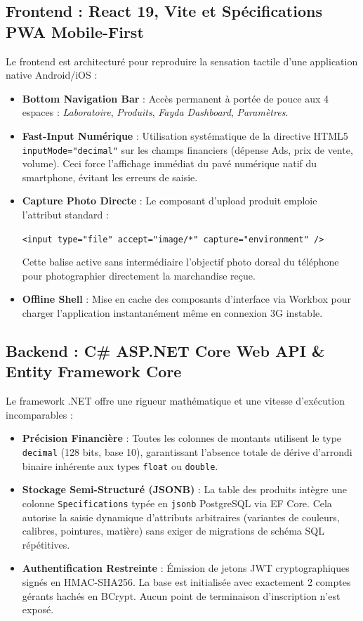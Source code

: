 \documentclass[11pt,a4paper]{article}
\begin{document}
\subsection{Frontend : React 19, Vite et Spécifications PWA Mobile-First}
Le frontend est architecturé pour reproduire la sensation tactile d'une application native Android/iOS :
\begin{itemize}[leftmargin=*]
    \item \textbf{Bottom Navigation Bar} : Accès permanent à portée de pouce aux 4 espaces : \textit{Laboratoire}, \textit{Produits}, \textit{Fayda Dashboard}, \textit{Paramètres}.
    \item \textbf{Fast-Input Numérique} : Utilisation systématique de la directive HTML5 \texttt{inputMode="decimal"} sur les champs financiers (dépense Ads, prix de vente, volume). Ceci force l'affichage immédiat du pavé numérique natif du smartphone, évitant les erreurs de saisie.
    \item \textbf{Capture Photo Directe} : Le composant d'upload produit emploie l'attribut standard :
    \begin{center}
        \texttt{<input type="file" accept="image/*" capture="environment" />}
    \end{center}
    Cette balise active sans intermédiaire l'objectif photo dorsal du téléphone pour photographier directement la marchandise reçue.
    \item \textbf{Offline Shell} : Mise en cache des composants d'interface via Workbox pour charger l'application instantanément même en connexion 3G instable.
\end{itemize}

\subsection{Backend : C\# ASP.NET Core Web API \& Entity Framework Core}
Le framework .NET offre une rigueur mathématique et une vitesse d'exécution incomparables :
\begin{itemize}[leftmargin=*]
    \item \textbf{Précision Financière} : Toutes les colonnes de montants utilisent le type \texttt{decimal} (128 bits, base 10), garantissant l'absence totale de dérive d'arrondi binaire inhérente aux types \texttt{float} ou \texttt{double}.
    \item \textbf{Stockage Semi-Structuré (JSONB)} : La table des produits intègre une colonne \texttt{Specifications} typée en \texttt{jsonb} PostgreSQL via EF Core. Cela autorise la saisie dynamique d'attributs arbitraires (variantes de couleurs, calibres, pointures, matière) sans exiger de migrations de schéma SQL répétitives.
    \item \textbf{Authentification Restreinte} : Émission de jetons JWT cryptographiques signés en HMAC-SHA256. La base est initialisée avec exactement 2 comptes gérants hachés en BCrypt. Aucun point de terminaison d'inscription n'est exposé.
\end{itemize}
\end{document}
